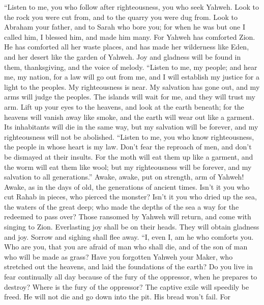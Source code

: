  ``Listen to me, you who follow after righteousness, you
who seek Yahweh. Look to the rock you were cut from, and to the quarry
you were dug from.  Look to Abraham your father, and to
Sarah who bore you; for when he was but one I called him, I blessed him,
and made him many.  For Yahweh has comforted Zion. He has
comforted all her waste places, and has made her wilderness like Eden,
and her desert like the garden of Yahweh. Joy and gladness will be found
in them, thanksgiving, and the voice of melody.  ``Listen
to me, my people; and hear me, my nation, for a law will go out from me,
and I will establish my justice for a light to the peoples.
 My righteousness is near. My salvation has gone out, and
my arms will judge the peoples. The islands will wait for me, and they
will trust my arm.  Lift up your eyes to the heavens, and
look at the earth beneath; for the heavens will vanish away like smoke,
and the earth will wear out like a garment. Its inhabitants will die in
the same way, but my salvation will be forever, and my righteousness
will not be abolished.  ``Listen to me, you who know
righteousness, the people in whose heart is my law. Don't fear the
reproach of men, and don't be dismayed at their insults. 
For the moth will eat them up like a garment, and the worm will eat them
like wool; but my righteousness will be forever, and my salvation to all
generations.''  Awake, awake, put on strength, arm of
Yahweh! Awake, as in the days of old, the generations of ancient times.
Isn't it you who cut Rahab in pieces, who pierced the monster?
 Isn't it you who dried up the sea, the waters of the
great deep; who made the depths of the sea a way for the redeemed to
pass over?  Those ransomed by Yahweh will return, and
come with singing to Zion. Everlasting joy shall be on their heads. They
will obtain gladness and joy. Sorrow and sighing shall flee away.
 ``I, even I, am he who comforts you. Who are you, that
you are afraid of man who shall die, and of the son of man who will be
made as grass?  Have you forgotten Yahweh your Maker, who
stretched out the heavens, and laid the foundations of the earth? Do you
live in fear continually all day because of the fury of the oppressor,
when he prepares to destroy? Where is the fury of the oppressor?
 The captive exile will speedily be freed. He will not
die and go down into the pit. His bread won't fail.  For
